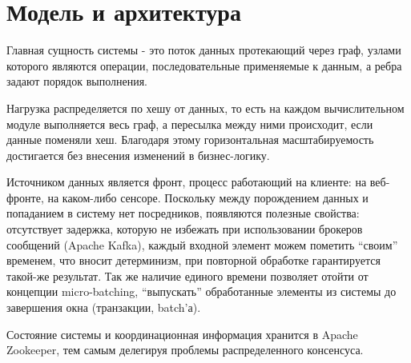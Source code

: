\documentclass[14pt]{matmex-diploma-custom}
\begin{document}
\maketitle

\tableofcontents

\section{Модель и архитектура}

Главная сущность системы - это поток данных протекающий через граф, узлами которого являются операции, последовательные применяемые к данным, а ребра задают порядок выполнения.

Нагрузка распределяется по хешу от данных, то есть на каждом вычислительном модуле выполняется весь граф, а пересылка между ними происходит, если данные поменяли хеш. Благодаря этому горизонтальная масштабируемость достигается без внесения изменений в бизнес-логику.

Источником данных является фронт, процесс работающий на клиенте: на веб-фронте, на каком-либо сенсоре. Поскольку между порождением данных и попаданием в систему нет посредников, появляются полезные свойства: отсутствует задержка, которую не избежать при использовании брокеров сообщений (Apache Kafka), каждый входной элемент можем пометить “своим” временем, что вносит детерминизм, при повторной обработке гарантируется такой-же результат. Так же наличие единого времени позволяет отойти от концепции micro-batching, “выпускать” обработанные элементы из системы до завершения окна (транзакции, batch’а).

Состояние системы и координационная информация хранится в  Apache Zookeeper, тем самым делегируя проблемы распределенного консенсуса.
\end{document}
